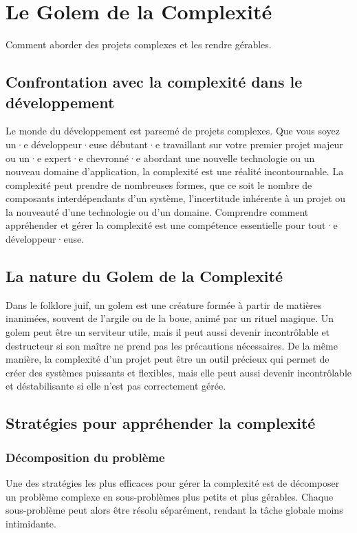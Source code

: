 \chapter{Le Golem de la Complexité}
Comment aborder des projets complexes et les rendre gérables.

\section{Confrontation avec la complexité dans le développement}

Le monde du développement est parsemé de projets complexes. Que vous soyez un·e développeur·euse débutant·e travaillant sur votre premier projet majeur ou un·e expert·e chevronné·e abordant une nouvelle technologie ou un nouveau domaine d'application, la complexité est une réalité incontournable. La complexité peut prendre de nombreuses formes, que ce soit le nombre de composants interdépendants d'un système, l'incertitude inhérente à un projet ou la nouveauté d'une technologie ou d'un domaine. Comprendre comment appréhender et gérer la complexité est une compétence essentielle pour tout·e développeur·euse.

\section{La nature du Golem de la Complexité}

Dans le folklore juif, un golem est une créature formée à partir de matières inanimées, souvent de l'argile ou de la boue, animé par un rituel magique. Un golem peut être un serviteur utile, mais il peut aussi devenir incontrôlable et destructeur si son maître ne prend pas les précautions nécessaires. De la même manière, la complexité d'un projet peut être un outil précieux qui permet de créer des systèmes puissants et flexibles, mais elle peut aussi devenir incontrôlable et déstabilisante si elle n'est pas correctement gérée.

\section{Stratégies pour appréhender la complexité}

\subsection{Décomposition du problème}
Une des stratégies les plus efficaces pour gérer la complexité est de décomposer un problème complexe en sous-problèmes plus petits et plus gérables. Chaque sous-problème peut alors être résolu séparément, rendant la tâche globale moins intimidante.

